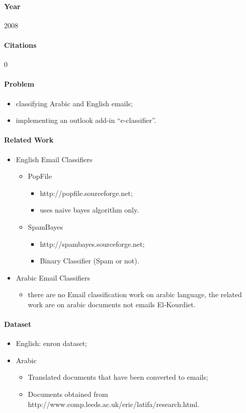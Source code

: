 \documentclass[12pt]{article}
\begin{document}
\paragraph{Year} 2008
\paragraph{Citations} 0

\paragraph{Problem}
\begin{itemize}
    \item classifying Arabic and English emails;
    \item implementing an outlook add-in ``e-classifier''.
\end{itemize}

\paragraph{Related Work}
\begin{itemize}
    \item English Email Classifiers
    \begin{itemize}
        \item PopFile
        \begin{itemize}
            \item http://popfile.sourceforge.net;
            \item uses naive bayes algorithm only.
        \end{itemize}
        \item SpamBayes
        \begin{itemize}
            \item http://spambayes.sourceforge.net;
            \item Binary Classifier (Spam or not).
        \end{itemize}
    \end{itemize}
    \item Arabic Email Classifiers
    \begin{itemize}
    \item there are no Email classification work on arabic language, the 
	  related work are on arabic documents not emails El-Kourdiet.
    \end{itemize}
\end{itemize}

\paragraph{Dataset}
\begin{itemize}
    \item English: enron dataset;
    \item Arabic
    \begin{itemize}
        \item Translated documents that have been converted to emails;
        \item Documents obtained from http://www.comp.leeds.ac.uk/eric/latifa/research.html.
    \end{itemize}
\end{itemize}
\end{document}
